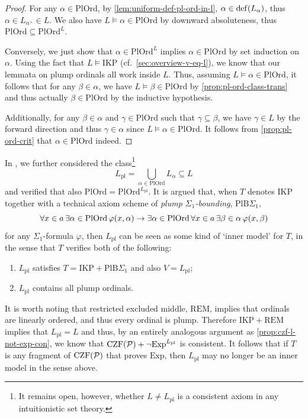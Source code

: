 \documentclass[12pt,openany]{book}
\theoremstyle{plain}
\theoremstyle{definition}
\newcommand\uplabel[1]{\textup{(#1)}}
\newcommand\opA[1]{\mathop{\forall #1}}
\newcommand\opE[1]{\mathop{\exists #1}}
\newcommand\Pow{\mathcal{P}}
\DeclareMathOperator\dd{def}
\newcommand\CZFP{\mathrm{CZF}\mleft(\Pow\mright)}
\newcommand\Exp{\mathrm{Exp}}
\newcommand\REM{\mathrm{REM}}
\newcommand\IKP{\mathrm{IKP}}
\newcommand\PlOrd{\mathrm{PlOrd}}
\newcommand\pl{\mathrm{pl}}
\newcommand\PlBSig{\mathrm{PlB}\Sigma_1}
\begin{document}
\begin{proof}
  For any $\alpha \in \PlOrd$, by \autoref{lem:uniform-def-pl-ord-in-l}, $\alpha \in \dd\mleft(L_\alpha\mright)$, thus $\alpha \in L_{\alpha^+} \in L$. We also have $L \vDash \alpha \in \PlOrd$ by downward absoluteness, thus $\PlOrd \subseteq \PlOrd^L$.

  Conversely, we just show that $\alpha \in \PlOrd^L$ implies $\alpha \in \PlOrd$ by set induction on $\alpha$. Using the fact that $L \vDash \IKP$ (cf.\ \autoref{sec:overview-v-eq-l}), we know that our lemmata on plump ordinals all work inside $L$. Thus, assuming $L \vDash \alpha \in \PlOrd$, it follows that for any $\beta \in \alpha$, we have $L \vDash \beta \in \PlOrd$ by \autoref{prop:pl-ord-class-trans} and thus actually $\beta \in \PlOrd$ by the inductive hypothesis.

  Additionally, for any $\beta \in \alpha$ and $\gamma \in \PlOrd$ such that $\gamma \subseteq \beta$, we have $\gamma \in L$ by the forward direction and thus $\gamma \in \alpha$ since $L \vDash \alpha \in \PlOrd$. It follows from \autoref{prop:pl-ord-crit} that $\alpha \in \PlOrd$ indeed.
\end{proof}

In \cite{wang-sw26-plump}, we further considered the class\footnote{It remains open, however, whether $L \neq L_\pl$ is a consistent axiom in any intuitionistic set theory.}
\[L_\pl = \bigcup_{\alpha \in \PlOrd} L_\alpha \subseteq L\]
and verified that also $\PlOrd = \PlOrd^{L_\pl}$. It is argued that, when $T$ denotes $\IKP$ together with a technical axiom scheme of \emph{plump $\Sigma_1$-bounding}, $\PlBSig$,
\[\opA{x \in a} \opE{\alpha \in \PlOrd} \varphi\mleft(x, \alpha\mright) \rightarrow \opE{\alpha \in \PlOrd} \opA{x \in a} \opE{\beta \in \alpha} \varphi\mleft(x, \beta\mright)\]
for any $\Sigma_1$-formula $\varphi$, then $L_\pl$ can be seen as some kind of `inner model' for $T$, in the sense that $T$ verifies both of the following:
\begin{enumerate}[label=\uplabel{\arabic*}]
  \item $L_\pl$ satisfies $T = \IKP + \PlBSig$ and also $V = L_\pl$;
  \item $L_\pl$ contains all plump ordinals.
\end{enumerate}

It is worth noting that restricted excluded middle, $\REM$, implies that ordinals are linearly ordered, and thus every ordinal is plump. Therefore $\IKP + \REM$ implies that $L_\pl = L$ and thus, by an entirely analogous argument as \autoref{prop:czf-l-not-exp-con}, we know that $\CZFP + \neg \Exp^{L_\pl}$ is consistent. It follows that if $T$ is any fragment of $\CZFP$ that proves $\Exp$, then $L_\pl$ may no longer be an inner model in the sense above.
\end{document}
